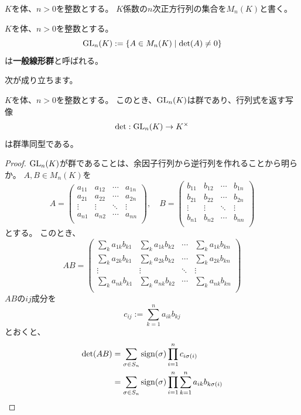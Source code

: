 \begin{definition}
  $K$を体、$n>0$を整数とする。
  $K$係数の$n$次正方行列の集合を$M_n(K)$と書く。
\end{definition}
\begin{definition}
  $K$を体、$n>0$を整数とする。
  \[
    {\rm GL}_n(K):=\{A\in M_n(K)\mid\det(A)\neq0\}
  \]
  は\textbf{一般線形群}と呼ばれる。
\end{definition}
次が成り立ちます。
\begin{theorem}
  $K$を体、$n>0$を整数とする。
  このとき、${\rm GL}_n(K)$は群であり、行列式を返す写像
  \[
    \det:{\rm GL}_n(K)\to K^\times
  \]
  は群準同型である。
\end{theorem}
\begin{proof}
  ${\rm GL}_n(K)$が群であることは、余因子行列から逆行列を作れることから明らか。
  $A,B\in M_n(K)$を
  \[
    A=\begin{pmatrix}
      a_{11} & a_{12} & \cdots & a_{1n}\\
      a_{21} & a_{22} & \cdots & a_{2n}\\
      \vdots & \vdots & \ddots & \vdots\\
      a_{n1} & a_{n2} & \cdots & a_{nn}\\
    \end{pmatrix},\quad
    B=\begin{pmatrix}
      b_{11} & b_{12} & \cdots & b_{1n}\\
      b_{21} & b_{22} & \cdots & b_{2n}\\
      \vdots & \vdots & \ddots & \vdots\\
      b_{n1} & b_{n2} & \cdots & b_{nn}\\
    \end{pmatrix}
  \]
  とする。
  このとき、
  \[
    AB=\begin{pmatrix}
      \sum_ka_{1k}b_{k1} & \sum_ka_{1k}b_{k2} & \cdots & \sum_ka_{1k}b_{kn}\\
      \sum_ka_{2k}b_{k1} & \sum_ka_{2k}b_{k2} & \cdots & \sum_ka_{2k}b_{kn}\\
      \vdots & \vdots & \ddots & \vdots\\
      \sum_ka_{nk}b_{k1} & \sum_ka_{nk}b_{k2} & \cdots & \sum_ka_{nk}b_{kn}\\
    \end{pmatrix}
  \]
  $AB$の$ij$成分を
  \[
    c_{ij}:=\sum_{k=1}^na_{ik}b_{kj}
  \]
  とおくと、
  \begin{align*}
    \det(AB)&=\sum_{\sigma\in S_n}{\rm sign}(\sigma)\prod_{i=1}^nc_{i\sigma(i)}\\
    &=\sum_{\sigma\in S_n}{\rm sign}(\sigma)\prod_{i=1}^n\sum_{k=1}^na_{ik}b_{k\sigma(i)}
  \end{align*}
\end{proof}

